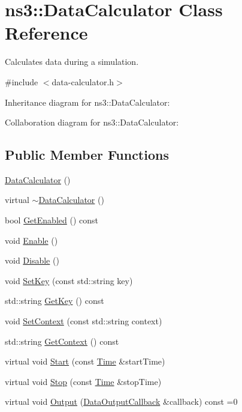 \hypertarget{classns3_1_1DataCalculator}{}\section{ns3\+:\+:Data\+Calculator Class Reference}
\label{classns3_1_1DataCalculator}


Calculates data during a simulation.  




{\ttfamily \#include $<$data-\/calculator.\+h$>$}



Inheritance diagram for ns3\+:\+:Data\+Calculator\+:


Collaboration diagram for ns3\+:\+:Data\+Calculator\+:
\subsection*{Public Member Functions}
\begin{DoxyCompactItemize}
\item 
\hyperlink{classns3_1_1DataCalculator_aa0a9460095694c9330b4b394ac9b1eeb}{Data\+Calculator} ()
\item 
virtual \hyperlink{classns3_1_1DataCalculator_a144480787b343d732e82b939daad5b1a}{$\sim$\+Data\+Calculator} ()
\item 
bool \hyperlink{classns3_1_1DataCalculator_a88c6779d1d7b51b90bcc1b8a7227a5a9}{Get\+Enabled} () const 
\item 
void \hyperlink{classns3_1_1DataCalculator_aa01dc751d69cb9a6fd5a58395e23a116}{Enable} ()
\item 
void \hyperlink{classns3_1_1DataCalculator_a8d775fd730106ebc97f6288e241549e1}{Disable} ()
\item 
void \hyperlink{classns3_1_1DataCalculator_ab7e545efa78d4a9e9c84a35b31b02a67}{Set\+Key} (const std\+::string key)
\item 
std\+::string \hyperlink{classns3_1_1DataCalculator_a3f6e49f70ad96c92c397e978870a5d32}{Get\+Key} () const 
\item 
void \hyperlink{classns3_1_1DataCalculator_a27bdcc354d99af631cb4fa87c1f8c21e}{Set\+Context} (const std\+::string context)
\item 
std\+::string \hyperlink{classns3_1_1DataCalculator_af4df17cc995498589f3b45b5da4e8d33}{Get\+Context} () const 
\item 
virtual void \hyperlink{classns3_1_1DataCalculator_a81c67150ff1b43b56947086745682757}{Start} (const \hyperlink{classns3_1_1Time}{Time} \&start\+Time)
\item 
virtual void \hyperlink{classns3_1_1DataCalculator_a8a8222eed4369e1c03aa69062b72d3e3}{Stop} (const \hyperlink{classns3_1_1Time}{Time} \&stop\+Time)
\item 
virtual void \hyperlink{classns3_1_1DataCalculator_a6217ea324b7235b9acf8554b509de8cc}{Output} (\hyperlink{classns3_1_1DataOutputCallback}{Data\+Output\+Callback} \&callback) const =0
\end{DoxyCompactItemize}
